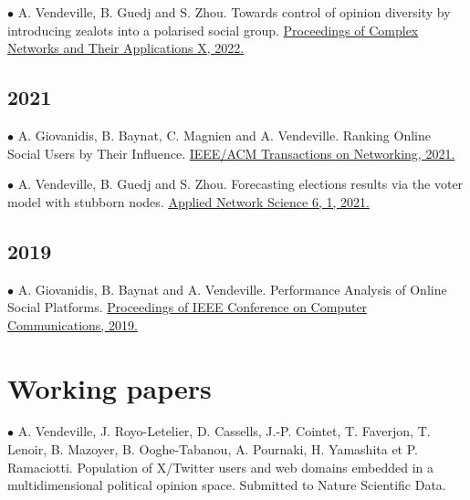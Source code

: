 \documentclass[a4paper,12pt]{article}
\begin{document}

$\bullet$ A. Vendeville, B. Guedj and S. Zhou. Towards control of opinion diversity by introducing zealots into a polarised social group. \href{https://doi.org/10.1007/978-3-030-93413-2_29}{Proceedings of Complex Networks and Their Applications X, 2022.} %

\subsection*{2021}
$\bullet$ A. Giovanidis, B. Baynat, C. Magnien and A. Vendeville. Ranking Online Social Users by Their Influence. \href{https://doi.org/10.1109/TNET.2021.3085201}{IEEE/ACM Transactions on Networking, 2021.} %

$\bullet$ A. Vendeville, B. Guedj and S. Zhou. Forecasting elections results via the voter model with stubborn nodes. \href{https://doi.org/10.1007/s41109-020-00342-7}{Applied Network Science 6, 1, 2021.} %

\subsection*{2019}
$\bullet$ A. Giovanidis, B. Baynat and A. Vendeville. Performance Analysis of Online Social Platforms. \href{https://ieeexplore.ieee.org/abstract/document/8737539}{Proceedings of IEEE Conference on Computer Communications, 2019.} %


\section*{Working papers}
$\bullet$ A. Vendeville, J. Royo-Letelier, D. Cassells, J.-P. Cointet, T. Faverjon, T. Lenoir, B. Mazoyer, B. Ooghe-Tabanou, A. Pournaki, H. Yamashita et P. Ramaciotti. Population of X/Twitter users and web domains embedded in a multidimensional political opinion space. Submitted to Nature Scientific Data.
\end{document}
